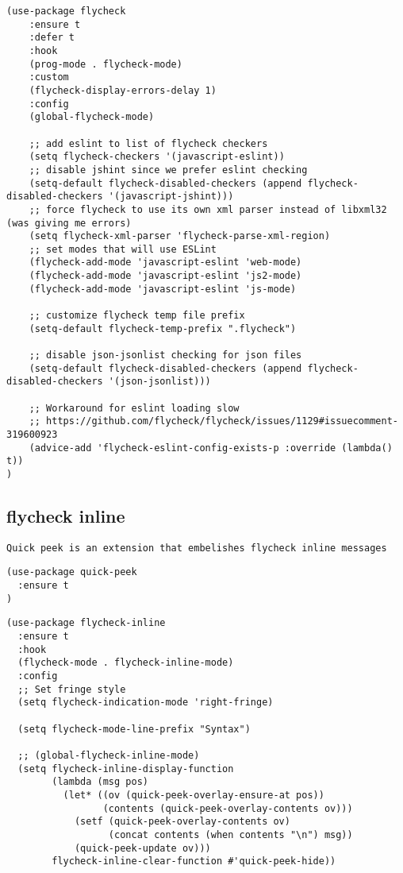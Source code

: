 \documentclass[11pt]{article}
\begin{document}
\begin{verbatim}
(use-package flycheck
    :ensure t
    :defer t
    :hook
    (prog-mode . flycheck-mode)
    :custom
    (flycheck-display-errors-delay 1)
    :config
    (global-flycheck-mode)

    ;; add eslint to list of flycheck checkers
    (setq flycheck-checkers '(javascript-eslint))
    ;; disable jshint since we prefer eslint checking
    (setq-default flycheck-disabled-checkers (append flycheck-disabled-checkers '(javascript-jshint)))
    ;; force flycheck to use its own xml parser instead of libxml32 (was giving me errors)
    (setq flycheck-xml-parser 'flycheck-parse-xml-region)
    ;; set modes that will use ESLint
    (flycheck-add-mode 'javascript-eslint 'web-mode)
    (flycheck-add-mode 'javascript-eslint 'js2-mode)
    (flycheck-add-mode 'javascript-eslint 'js-mode)

    ;; customize flycheck temp file prefix
    (setq-default flycheck-temp-prefix ".flycheck")

    ;; disable json-jsonlist checking for json files
    (setq-default flycheck-disabled-checkers (append flycheck-disabled-checkers '(json-jsonlist)))

    ;; Workaround for eslint loading slow
    ;; https://github.com/flycheck/flycheck/issues/1129#issuecomment-319600923
    (advice-add 'flycheck-eslint-config-exists-p :override (lambda() t))
)

\end{verbatim}


\subsection*{flycheck inline}
\label{sec:orgd43be8a}

\begin{verbatim}
Quick peek is an extension that embelishes flycheck inline messages
\end{verbatim}


\begin{verbatim}
(use-package quick-peek
  :ensure t
)
\end{verbatim}

\begin{verbatim}
(use-package flycheck-inline
  :ensure t
  :hook
  (flycheck-mode . flycheck-inline-mode)
  :config
  ;; Set fringe style
  (setq flycheck-indication-mode 'right-fringe)

  (setq flycheck-mode-line-prefix "Syntax")

  ;; (global-flycheck-inline-mode)
  (setq flycheck-inline-display-function
        (lambda (msg pos)
          (let* ((ov (quick-peek-overlay-ensure-at pos))
                 (contents (quick-peek-overlay-contents ov)))
            (setf (quick-peek-overlay-contents ov)
                  (concat contents (when contents "\n") msg))
            (quick-peek-update ov)))
        flycheck-inline-clear-function #'quick-peek-hide))
\end{verbatim}
\end{document}
